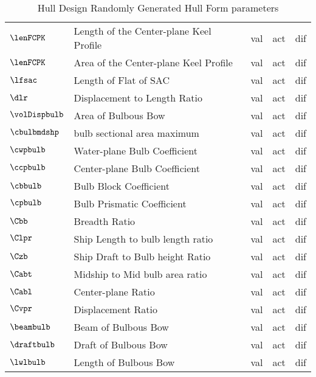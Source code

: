 \begin{small}
\begin{table}
{\begin{tabular}{llrrr}
			$\lenFCPK$  & Length of the Center-plane Keel Profile 	& {val} & {act} 	&   {dif}        	\\
			$\lenFCPK$  & Area of the Center-plane Keel Profile 	& {val} & {act} 	&   {dif}       	\\
			$\lfsac$  	& Length of Flat of SAC  					& {val}	& {act} 	&   {dif}           \\
			$\dlr$  	& Displacement to Length Ratio 				& {val} & {act} 	&   {dif}           \\
			$\volDispbulb$  & Area of Bulbous Bow 				& {val} & {act} 	&   {dif}           \\
			$\cbulbmdshp$  	& bulb sectional area maximum 		& {val} & {act} 	&   {dif}           \\
			$\cwpbulb$  	& Water-plane Bulb Coefficient  	& {val}	& {act} 	&   {dif}           \\
			$\ccpbulb$  	& Center-plane Bulb Coefficient  	& {val} & {act} 	&   {dif}           \\
			$\cbbulb$  		& Bulb Block Coefficient  			& {val}	& {act} 	&   {dif}           \\
			$\cpbulb$  		& Bulb Prismatic Coefficient    	& {val} & {act} 	&   {dif}           \\
			$\Cbb$  		& Breadth Ratio 					& {val} & {act} 	&   {dif}           \\
			$\Clpr$  		& Ship Length to bulb length ratio  & {val} & {act} 	&   {dif}           \\
			$\Czb$  		& Ship Draft to Bulb height Ratio  	& {val} & {act} 	&   {dif}           \\
			$\Cabt$  		& Midship to Mid bulb area ratio    & {val}	& {act} 	&   {dif}           \\
			$\Cabl$  		& Center-plane Ratio  				& {val}	& {act} 	&   {dif}           \\
			$\Cvpr$  		& Displacement Ratio   				& {val} & {act} 	&   {dif}           \\
			$\beambulb$  	& Beam of Bulbous Bow 				& {val} & {act} 	&   {dif}           \\
			$\draftbulb$  	& Draft of Bulbous Bow 				& {val} & {act} 	&   {dif}           \\
			$\lwlbulb$  	& Length of Bulbous Bow 			& {val} & {act} 	&   {dif}           \\
			\bottomrule
		\end{tabular}
		}
		\caption{Hull Design Randomly Generated Hull Form parameters}
		\label{tbl:1_logic2fpdcompare}
	\end{table}
\end{small}
